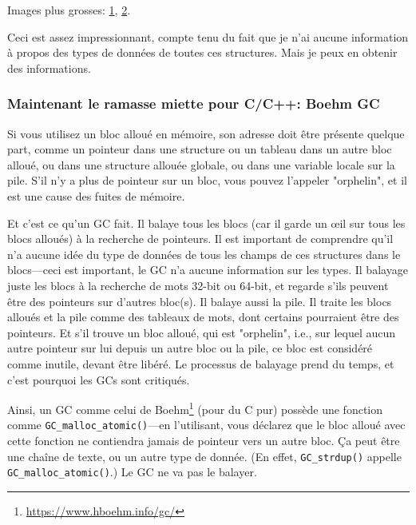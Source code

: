 Images plus grosses:
\href{https://raw.githubusercontent.com/DennisYurichev/RE-for-beginners/master/advanced/450_more_ptrs/oracle1.png}{1},
\href{https://raw.githubusercontent.com/DennisYurichev/RE-for-beginners/master/advanced/450_more_ptrs/oracle2.png}{2}.

Ceci est assez impressionnant, compte tenu du fait que je n'ai aucune information
à propos des types de données de toutes ces structures.
Mais je peux en obtenir des informations.

\subsubsection{Maintenant le ramasse miette pour C/C++: Boehm GC}

Si vous utilisez un bloc alloué en mémoire, son adresse doit être présente quelque
part, comme un pointeur dans une structure ou un tableau dans un autre bloc alloué,
ou dans une structure allouée globale, ou dans une variable locale sur la pile.
S'il n'y a plus de pointeur sur un bloc, vous pouvez l'appeler "orphelin", et il
est une cause des fuites de mémoire.

Et c'est ce qu'un \ac{GC} fait.
Il balaye tous les blocs (car il garde un \oe{}il sur tous les blocs alloués) à
la recherche de pointeurs.
Il est important de comprendre qu'il n'a aucune idée du type de données de tous les
champs de ces structures dans le blocs---ceci est important, le \ac{GC} n'a aucune information
sur les types.
Il balayage juste les blocs à la recherche de mots 32-bit ou 64-bit, et regarde s'ils
peuvent être des pointeurs sur d'autres bloc(s).
Il balaye aussi la pile.
Il traite les blocs alloués et la pile comme des tableaux de mots, dont certains pourraient
être des pointeurs.
Et s'il trouve un bloc alloué, qui est "orphelin", i.e., sur lequel aucun autre pointeur
sur lui depuis un autre bloc ou la pile, ce bloc est considéré comme inutile, devant
être libéré.
Le processus de balayage prend du temps, et c'est pourquoi les \ac{GC}s sont critiqués.

Ainsi, un \ac{GC} comme celui de Boehm\footnote{\url{https://www.hboehm.info/gc/}}
(pour du C pur) possède une fonction comme \verb|GC_malloc_atomic()|---en l'utilisant,
vous  déclarez que le bloc alloué avec cette fonction ne contiendra jamais de pointeur
vers un autre bloc.
Ça peut être une chaîne de texte, ou un autre type de donnée.
(En effet, \verb|GC_strdup()| appelle \verb|GC_malloc_atomic()|.)
Le \ac{GC} ne va pas le balayer.

